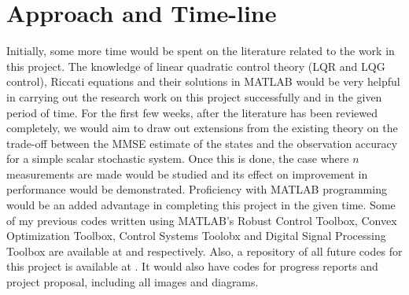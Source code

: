 \documentclass[a4paper,12pt]{article}
\begin{document}
\section{Approach and Time-line}
Initially, some more time would be spent on the literature related to the work in this project. The knowledge of linear quadratic control theory (LQR and LQG control), Riccati equations and their solutions in MATLAB would be very helpful in carrying out the research work on this project successfully and in the given period of time. For the first few weeks, after the literature has been reviewed completely, we would aim to draw out extensions from the existing theory on the trade-off between the MMSE estimate of the states and the observation accuracy for a simple scalar stochastic system. Once this is done, the case where $n$ measurements are made would be studied and its effect on improvement in performance would be demonstrated. Proficiency with MATLAB programming would be an added advantage in completing this project in the given time. Some of my previous codes written using MATLAB's Robust Control Toolbox, Convex Optimization Toolbox, Control Systems Toolobx and Digital Signal Processing Toolbox are available at \cite{git_rct} and \cite{git_dac} respectively. Also, a repository of all future codes for this project is available at \cite{git}. It would also have codes for progress reports and project proposal, including all images and diagrams.

\printbibliography
     
\end{document}
